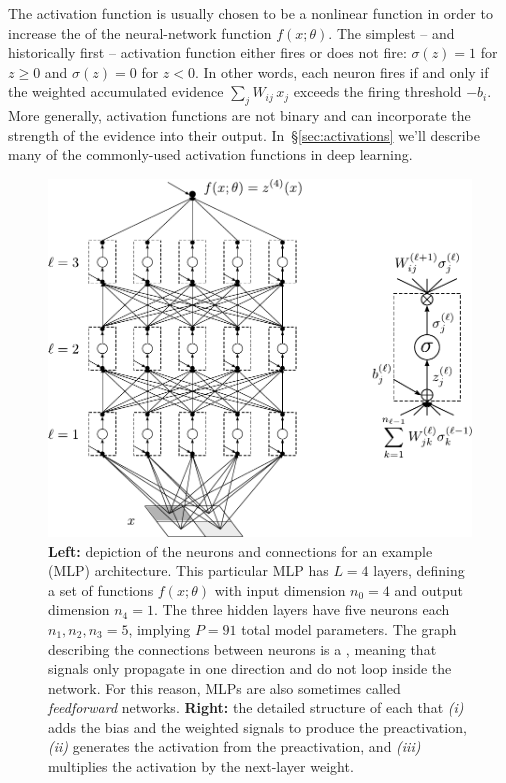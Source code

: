 The activation function is usually chosen to be a nonlinear function in order to increase the 
of the neural-network function $f(x;\theta)$.
The simplest -- and historically first -- activation function either fires or does not fire: $\sigma(z) =1$ for $z\geq0$ and $\sigma(z) =0$ for $z<0$. In other words, each neuron fires if and only if the weighted accumulated evidence $\sum_jW_{ij}\, x_{j}$ exceeds the firing threshold $-b_i$. More generally, activation functions are not binary and can incorporate
the strength of the evidence into their output. In~\S\ref{sec:activations} we'll describe many of the commonly-used activation functions in deep learning. 

\begin{figure}
\begin{center}
 \includegraphics[width=.9\linewidth]{./book_figures/mlp.pdf}
\caption{
\textbf{Left:} depiction of the neurons and connections for an example  (MLP) architecture.  This particular MLP has $L=4$ layers, defining a set of functions $f(x; \theta)$ with input dimension $n_0=4$ and output dimension $n_{4}=1$. The three hidden layers have five neurons each $n_1, n_2, n_3 = 5$, implying $P=91$ total model parameters. 
The graph describing the connections between neurons is a , meaning that signals only propagate in one direction and do not loop inside the network.
For this reason, MLPs are also sometimes called \emph{feedforward} networks.
\textbf{Right:} the detailed structure of each  that \emph{(i)} adds the bias 
and the weighted signals 
to produce the preactivation, 
\emph{(ii)} generates the activation 
from the preactivation, and \emph{(iii)} multiplies the activation by the next-layer weight.
}
\label{fig:ff-example}
\end{center}
\end{figure}


